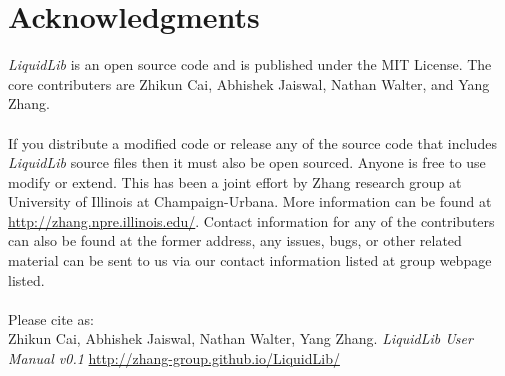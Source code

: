 \documentclass{article}
\begin{document}
\section{Acknowledgments}
\textit{LiquidLib} is an open source code and is published under the MIT License.  The core contributers are Zhikun Cai, Abhishek Jaiswal, Nathan Walter, and Yang Zhang.   
\\
\\
If you distribute a modified code or release any of the source code that includes \textit{LiquidLib} source files then it must also be open sourced.  Anyone is free to use modify or extend.  This has been a joint effort by Zhang research group at University of Illinois at Champaign-Urbana.  More information can be found at \url{http://zhang.npre.illinois.edu/}.  Contact information for any of the contributers can also be found at the former address, any issues, bugs, or other related material can be sent to us via our contact information listed at group webpage listed.
\\
\\
Please cite as:\\
\hspace*{1cm}Zhikun Cai, Abhishek Jaiswal, Nathan Walter, Yang Zhang. \textit{LiquidLib User Manual v0.1} \url{http://zhang-group.github.io/LiquidLib/} 
\end{document}

